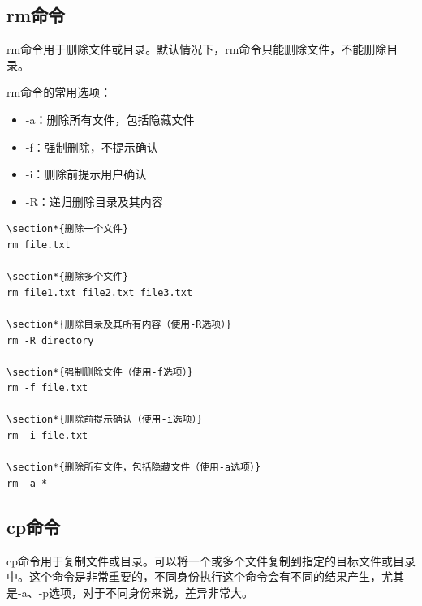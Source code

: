 \documentclass[12pt,UTF8]{ctexbook}
\begin{document}
\subsection{rm命令}
rm命令用于删除文件或目录。默认情况下，rm命令只能删除文件，不能删除目录。

rm命令的常用选项：
\begin{itemize}
    \item -a：删除所有文件，包括隐藏文件
    \item -f：强制删除，不提示确认
    \item -i：删除前提示用户确认
    \item -R：递归删除目录及其内容
\end{itemize}

\begin{verbatim}
\section*{删除一个文件}
rm file.txt

\section*{删除多个文件}
rm file1.txt file2.txt file3.txt

\section*{删除目录及其所有内容（使用-R选项）}
rm -R directory

\section*{强制删除文件（使用-f选项）}
rm -f file.txt

\section*{删除前提示确认（使用-i选项）}
rm -i file.txt

\section*{删除所有文件，包括隐藏文件（使用-a选项）}
rm -a *
\end{verbatim}

\subsection{cp命令}
cp命令用于复制文件或目录。可以将一个或多个文件复制到指定的目标文件或目录中。这个命令是非常重要的，不同身份执行这个命令会有不同的结果产生，尤其是-a、-p选项，对于不同身份来说，差异非常大。
\end{document}
